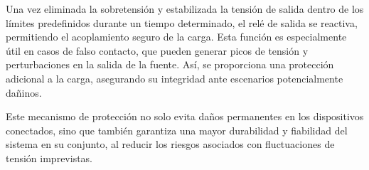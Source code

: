 Una vez eliminada la sobretensión y estabilizada la tensión de salida dentro de los límites predefinidos durante un tiempo determinado, el relé de salida se reactiva, permitiendo el acoplamiento seguro de la carga. Esta función es especialmente útil en casos de falso contacto, que pueden generar picos de tensión y perturbaciones en la salida de la fuente. Así, se proporciona una protección adicional a la carga, asegurando su integridad ante escenarios potencialmente dañinos. \par

Este mecanismo de protección no solo evita daños permanentes en los dispositivos conectados, sino que también garantiza una mayor durabilidad y fiabilidad del sistema en su conjunto, al reducir los riesgos asociados con fluctuaciones de tensión imprevistas. \par
